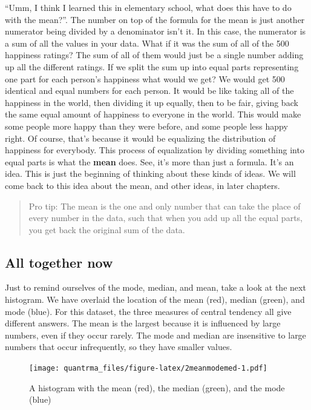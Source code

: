 \documentclass[
]{book}
\begin{document}
``Umm, I think I learned this in elementary school, what does this have to do with the mean?''. The number on top of the formula for the mean is just another numerator being divided by a denominator isn't it. In this case, the numerator is a sum of all the values in your data. What if it was the sum of all of the 500 happiness ratings? The sum of all of them would just be a single number adding up all the different ratings. If we split the sum up into equal parts representing one part for each person's happiness what would we get? We would get 500 identical and equal numbers for each person. It would be like taking all of the happiness in the world, then dividing it up equally, then to be fair, giving back the same equal amount of happiness to everyone in the world. This would make some people more happy than they were before, and some people less happy right. Of course, that's because it would be equalizing the distribution of happiness for everybody. This process of equalization by dividing something into equal parts is what the \textbf{mean} does. See, it's more than just a formula. It's an idea. This is just the beginning of thinking about these kinds of ideas. We will come back to this idea about the mean, and other ideas, in later chapters.

\begin{quote}
Pro tip: The mean is the one and only number that can take the place of every number in the data, such that when you add up all the equal parts, you get back the original sum of the data.
\end{quote}

\hypertarget{all-together-now}{%
\subsection{All together now}\label{all-together-now}}

Just to remind ourselves of the mode, median, and mean, take a look at the next histogram. We have overlaid the location of the mean (red), median (green), and mode (blue). For this dataset, the three measures of central tendency all give different answers. The mean is the largest because it is influenced by large numbers, even if they occur rarely. The mode and median are insensitive to large numbers that occur infrequently, so they have smaller values.

\begin{figure}
\centering
\texttt{[image: quantrma\_files/figure-latex/2meanmodemed-1.pdf]}
\caption{\label{fig:2meanmodemed}A histogram with the mean (red), the median (green), and the mode (blue)}
\end{figure}
\end{document}
